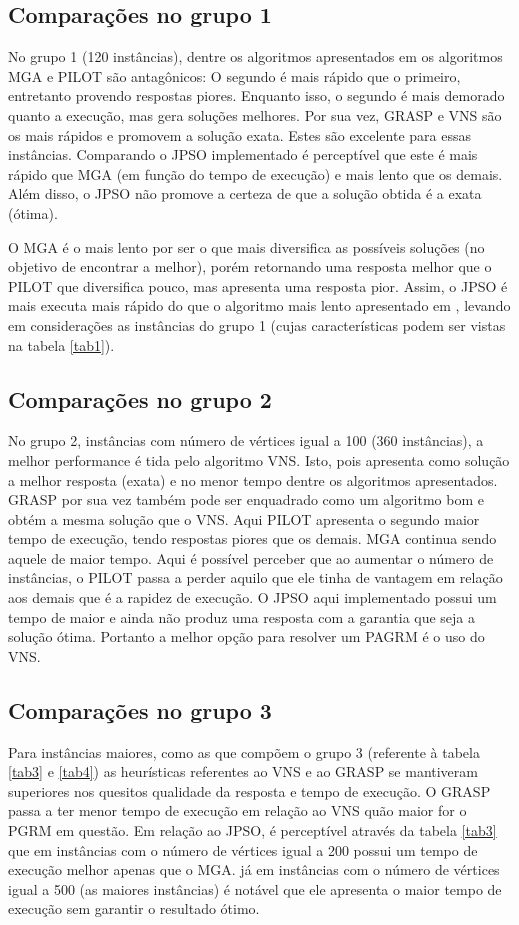 \documentclass{sig-alternate-05-2015}
\begin{document}
\subsection{Comparações no grupo 1}
No grupo 1 (120 instâncias), dentre os algoritmos apresentados em \cite{} os algoritmos MGA e PILOT são antagônicos: O segundo é mais rápido que o primeiro, entretanto provendo respostas piores. Enquanto isso, o segundo é mais demorado quanto a execução, mas gera soluções melhores. Por sua vez, GRASP e VNS são os mais rápidos e promovem a solução exata. Estes são excelente para essas instâncias. Comparando o JPSO implementado é perceptível que este é mais rápido que MGA (em função do tempo de execução) e mais lento que os demais. Além disso, o JPSO não promove a certeza de que a solução obtida é a exata (ótima). 

O MGA é o mais lento por ser o que mais diversifica as possíveis soluções (no objetivo de encontrar a melhor), porém retornando uma resposta melhor que o PILOT que
diversifica pouco, mas apresenta uma resposta pior. Assim, o JPSO é mais executa mais rápido do que o algoritmo mais lento apresentado em \cite{} , levando em considerações as instâncias do grupo 1 (cujas características podem ser vistas na tabela \ref{tab1}).



\subsection{Comparações no grupo 2}
	No grupo 2, instâncias com número de vértices igual a 100 (360 instâncias), a melhor performance é tida pelo algoritmo VNS. Isto, pois apresenta como solução a melhor resposta (exata) e no menor tempo dentre os algoritmos apresentados. GRASP por sua vez também pode ser enquadrado como um algoritmo bom e obtém a mesma solução que o VNS. Aqui PILOT apresenta o segundo maior tempo de execução, tendo respostas piores que os demais. MGA continua sendo aquele de maior tempo. Aqui é possível perceber que ao aumentar o número de instâncias, o PILOT passa a perder aquilo que ele tinha de vantagem em relação aos demais que é a rapidez de execução. O JPSO aqui implementado possui um tempo de maior e ainda não produz uma resposta com a garantia que seja a solução ótima. Portanto a melhor opção para resolver um PAGRM é o uso do VNS.

\subsection{Comparações no grupo 3}
Para instâncias maiores, como as que compõem o grupo 3 (referente à tabela \ref{tab3} e \ref{tab4}) as heurísticas referentes ao VNS e ao GRASP se mantiveram superiores nos quesitos qualidade da resposta e tempo de execução. O GRASP passa a ter menor tempo de execução em relação ao VNS quão maior for o PGRM em questão. Em relação ao JPSO, é perceptível através da tabela \ref{tab3} que em instâncias com o número de vértices igual a 200 possui um tempo de execução melhor apenas que o MGA. já em instâncias com o número de vértices igual a 500 (as maiores instâncias) é notável que ele apresenta o maior tempo de execução sem garantir o resultado ótimo.
\end{document}
